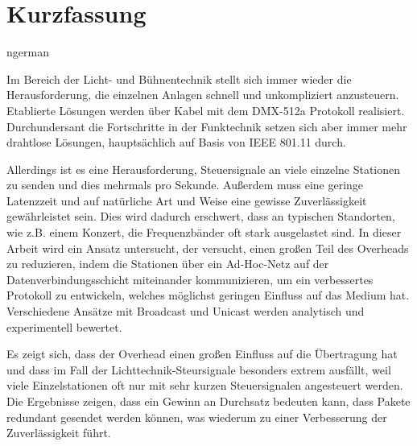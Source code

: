 \documentclass[]{ccs-thesis}
\begin{document}
\chapter*{Kurzfassung}
\begin{otherlanguage*}{ngerman}

Im Bereich der Licht- und Bühnentechnik stellt sich immer wieder die Herausforderung, 
die einzelnen Anlagen schnell und unkompliziert anzusteuern. 
Etablierte Lösungen werden über Kabel mit dem DMX-512a Protokoll realisiert. 
Durchundersant die Fortschritte in der Funktechnik setzen sich aber immer mehr drahtlose Lösungen, 
hauptsächlich auf Basis von IEEE 801.11 durch. 

Allerdings ist es eine Herausforderung, Steuersignale an viele einzelne Stationen zu senden 
und dies mehrmals pro Sekunde.
Außerdem muss eine geringe Latenzzeit und auf natürliche Art und Weise eine gewisse Zuverlässigkeit gewährleistet sein.
Dies wird dadurch erschwert, dass an typischen Standorten, wie z.B. einem Konzert, 
die Frequenzbänder oft stark ausgelastet sind. 
In dieser Arbeit wird ein Ansatz untersucht, der versucht, einen großen Teil des Overheads zu reduzieren,
indem die Stationen über ein Ad-Hoc-Netz auf der Datenverbindungsschicht miteinander kommunizieren,
um ein verbessertes Protokoll zu entwickeln, welches möglichst geringen Einfluss auf das Medium hat.
Verschiedene Ansätze mit Broadcast und Unicast werden analytisch und experimentell bewertet.

Es zeigt sich, dass der Overhead einen großen Einfluss auf die Übertragung hat 
und dass im Fall der Lichttechnik-Steursignale besonders extrem ausfällt,
weil viele Einzelstationen oft nur mit sehr kurzen Steuersignalen angesteuert werden.
Die Ergebnisse zeigen, dass ein Gewinn an Durchsatz bedeuten kann, 
dass Pakete redundant gesendet werden können,
was wiederum zu einer Verbesserung der Zuverlässigkeit führt.

\end{otherlanguage*}
\acresetall

\cleardoublepage
\tableofcontents

\cleardoublepage
{}












% 

\cleardoublepage

\listofabbreviations
\clearpage

\listoffigures
\clearpage

\listoftables
\clearpage

\lstlistoflistings
\clearpage

\printbibliography
\end{document}
